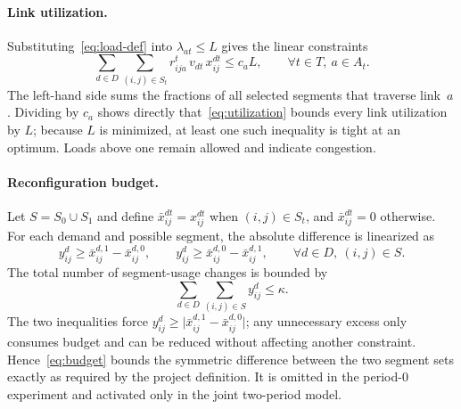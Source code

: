 \paragraph{Link utilization.}
Substituting~\eqref{eq:load-def} into $\lambda_{at}\le L$ gives the linear constraints
\begin{equation}
\sum_{d\in D}\sum_{(i,j)\in S_t} r^t_{ija}\,v_{dt}\,x^{dt}_{ij}\le c_a L,
\qquad \forall t\in T,\ a\in A_t.
\label{eq:utilization}
\end{equation}
The left-hand side sums the fractions of all selected segments that traverse link~$a$. Dividing by
$c_a$ shows directly that~\eqref{eq:utilization} bounds every link utilization by $L$; because $L$ is
minimized, at least one such inequality is tight at an optimum. Loads above one remain allowed and
indicate congestion.

\paragraph{Reconfiguration budget.}
Let $S=S_0\cup S_1$ and define $\bar x^{dt}_{ij}=x^{dt}_{ij}$ when $(i,j)\in S_t$, and
$\bar x^{dt}_{ij}=0$ otherwise. For each demand and possible segment, the absolute difference is
linearized as
\begin{equation}
y^d_{ij}\ge \bar x^{d,1}_{ij}-\bar x^{d,0}_{ij},
\qquad
y^d_{ij}\ge \bar x^{d,0}_{ij}-\bar x^{d,1}_{ij},
\qquad \forall d\in D,\ (i,j)\in S.
\label{eq:change}
\end{equation}
The total number of segment-usage changes is bounded by
\begin{equation}
\sum_{d\in D}\sum_{(i,j)\in S} y^d_{ij}\le\kappa.
\label{eq:budget}
\end{equation}
The two inequalities force $y^d_{ij}\ge\lvert\bar x^{d,1}_{ij}-\bar x^{d,0}_{ij}\rvert$; any
unnecessary excess only consumes budget and can be reduced without affecting another constraint.
Hence~\eqref{eq:budget} bounds the symmetric difference between the two segment sets exactly as
required by the project definition. It is omitted in the period-0 experiment and activated only in the
joint two-period model.
